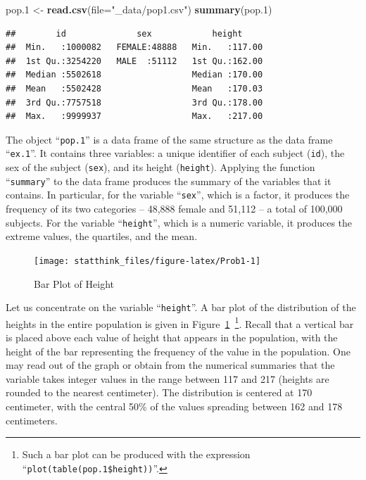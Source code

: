 \documentclass[]{krantz}
\makeatletter
\newenvironment{Shaded}{\begin{snugshade}}{\end{snugshade}}
\newcommand{\DataTypeTok}[1]{\textcolor[rgb]{0.13,0.29,0.53}{#1}}
\newcommand{\FloatTok}[1]{\textcolor[rgb]{0.00,0.00,0.81}{#1}}
\newcommand{\KeywordTok}[1]{\textcolor[rgb]{0.13,0.29,0.53}{\textbf{#1}}}
\newcommand{\NormalTok}[1]{#1}
\newcommand{\StringTok}[1]{\textcolor[rgb]{0.31,0.60,0.02}{#1}}
\newenvironment{kframe}{%
\medskip{}
\setlength{\fboxsep}{.8em}
 \def\at@end@of@kframe{}%
 \ifinner\ifhmode%
  \def\at@end@of@kframe{\end{minipage}}%
  \begin{minipage}{\columnwidth}%
 \fi\fi%
 \def\FrameCommand##1{\hskip\@totalleftmargin \hskip-\fboxsep
 \colorbox{shadecolor}{##1}\hskip-\fboxsep
     \hskip-\linewidth \hskip-\@totalleftmargin \hskip\columnwidth}%
 \MakeFramed {\advance\hsize-\width
   \@totalleftmargin\z@ \linewidth\hsize
   \@setminipage}}%
 {\par\unskip\endMakeFramed%
 \at@end@of@kframe}
\renewenvironment{Shaded}{\begin{kframe}}{\end{kframe}}
\theoremstyle{definition}
\theoremstyle{definition}
\theoremstyle{definition}
\theoremstyle{remark}
\makeatother
\begin{document}
\begin{Shaded}
\begin{Highlighting}[]
\NormalTok{pop}\FloatTok{.1}\NormalTok{ <-}\StringTok{ }\KeywordTok{read.csv}\NormalTok{(}\DataTypeTok{file=}\StringTok{"_data/pop1.csv"}\NormalTok{)}
\KeywordTok{summary}\NormalTok{(pop}\FloatTok{.1}\NormalTok{)}
\end{Highlighting}
\end{Shaded}

\begin{verbatim}
##        id              sex            height      
##  Min.   :1000082   FEMALE:48888   Min.   :117.00  
##  1st Qu.:3254220   MALE  :51112   1st Qu.:162.00  
##  Median :5502618                  Median :170.00  
##  Mean   :5502428                  Mean   :170.03  
##  3rd Qu.:7757518                  3rd Qu.:178.00  
##  Max.   :9999937                  Max.   :217.00
\end{verbatim}

The object ``\texttt{pop.1}'' is a data frame of the same structure as the data
frame ``\texttt{ex.1}''. It contains three variables: a unique identifier of each
subject (\texttt{id}), the sex of the subject (\texttt{sex}), and its height
(\texttt{height}). Applying the function ``\texttt{summary}'' to the data frame produces
the summary of the variables that it contains. In particular, for the
variable ``\texttt{sex}'', which is a factor, it produces the frequency of its
two categories -- 48,888 female and 51,112 -- a total of 100,000 subjects.
For the variable ``\texttt{height}'', which is a numeric variable, it produces
the extreme values, the quartiles, and the mean.

\begin{figure}

{\centering \texttt{[image: statthink\_files/figure-latex/Prob1-1]} 

}

\caption{Bar Plot of Height}\label{fig:Prob1}
\end{figure}

Let us concentrate on the variable ``\texttt{height}''. A bar plot of the
distribution of the heights in the entire population is given in
Figure~\ref{fig:Prob1}~\footnote{Such a bar plot can be produced with the expression
  ``\texttt{plot(table(pop.1\$height))}''.}. Recall that a vertical bar is placed
above each value of height that appears in the population, with the
height of the bar representing the frequency of the value in the
population. One may read out of the graph or obtain from the numerical
summaries that the variable takes integer values in the range between
117 and 217 (heights are rounded to the nearest centimeter). The
distribution is centered at 170 centimeter, with the central 50\% of the
values spreading between 162 and 178 centimeters.
\end{document}
